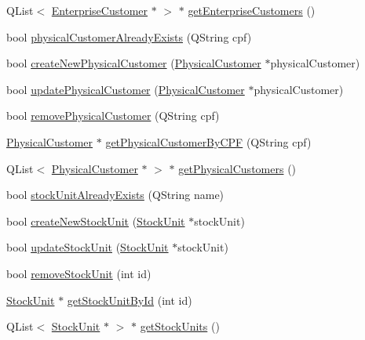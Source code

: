 \begin{DoxyCompactItemize}
\item 
\-Q\-List$<$ \hyperlink{class_enterprise_customer}{\-Enterprise\-Customer} $\ast$ $>$ $\ast$ \hyperlink{class_database_controller_a5fa00fca0d6f3bc624776d14ad9af382}{get\-Enterprise\-Customers} ()
\item 
bool \hyperlink{class_database_controller_abdddf03f7380b3915392f9be39845740}{physical\-Customer\-Already\-Exists} (\-Q\-String cpf)
\item 
bool \hyperlink{class_database_controller_a5fe9d26cea506b3b657752aeabb290d4}{create\-New\-Physical\-Customer} (\hyperlink{class_physical_customer}{\-Physical\-Customer} $\ast$physical\-Customer)
\item 
bool \hyperlink{class_database_controller_a4a485c3dec3f6202bd6fe88e7f4a01c3}{update\-Physical\-Customer} (\hyperlink{class_physical_customer}{\-Physical\-Customer} $\ast$physical\-Customer)
\item 
bool \hyperlink{class_database_controller_a8b6873e12fc3fbe473f96d7b4b367fd8}{remove\-Physical\-Customer} (\-Q\-String cpf)
\item 
\hyperlink{class_physical_customer}{\-Physical\-Customer} $\ast$ \hyperlink{class_database_controller_a593862e3a00f8751ce2d0dc4ea13ba29}{get\-Physical\-Customer\-By\-C\-P\-F} (\-Q\-String cpf)
\item 
\-Q\-List$<$ \hyperlink{class_physical_customer}{\-Physical\-Customer} $\ast$ $>$ $\ast$ \hyperlink{class_database_controller_af63c735fd481762203ccd96f024d5842}{get\-Physical\-Customers} ()
\item 
bool \hyperlink{class_database_controller_a60e620723b648b5a830aa522225ccfad}{stock\-Unit\-Already\-Exists} (\-Q\-String name)
\item 
bool \hyperlink{class_database_controller_a38bb84c61c69283b06573226174bf20f}{create\-New\-Stock\-Unit} (\hyperlink{class_stock_unit}{\-Stock\-Unit} $\ast$stock\-Unit)
\item 
bool \hyperlink{class_database_controller_a4e48353bf332493432458977bc41817f}{update\-Stock\-Unit} (\hyperlink{class_stock_unit}{\-Stock\-Unit} $\ast$stock\-Unit)
\item 
bool \hyperlink{class_database_controller_a8314c6b66bf638f30fce689a2d2420ea}{remove\-Stock\-Unit} (int id)
\item 
\hyperlink{class_stock_unit}{\-Stock\-Unit} $\ast$ \hyperlink{class_database_controller_ae3008735fbd78dd2229f3e75e921df94}{get\-Stock\-Unit\-By\-Id} (int id)
\item 
\-Q\-List$<$ \hyperlink{class_stock_unit}{\-Stock\-Unit} $\ast$ $>$ $\ast$ \hyperlink{class_database_controller_ae9fbca4ab45505e7026985614d1f3b2b}{get\-Stock\-Units} ()

\end{DoxyCompactItemize}
